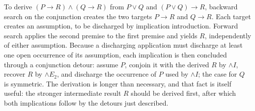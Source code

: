 \begin{example}
To derive \((P\to R)\land(Q\to R)\) from \(P\lor Q\) and
\((P\lor Q)\to R\), backward search on the conjunction creates the two targets
\(P\to R\) and \(Q\to R\).  Each target creates an assumption, to be
discharged by
implication introduction.  Forward search applies the second premise to the
first premise and yields \(R\), independently of either assumption.
Because a discharging application must discharge at least one open
occurrence of its assumption, each implication is then concluded through
a conjunction detour: assume \(P\), conjoin it with the derived \(R\) by
\(\land I\), recover \(R\) by \(\land E_2\), and discharge the occurrence
of \(P\) used by \(\land I\); the case for \(Q\) is symmetric.  The
derivation is longer than
necessary, and that fact is itself useful: the stronger intermediate result
\(R\) should be derived first, after which both implications follow by
the detours just described.
\end{example}


